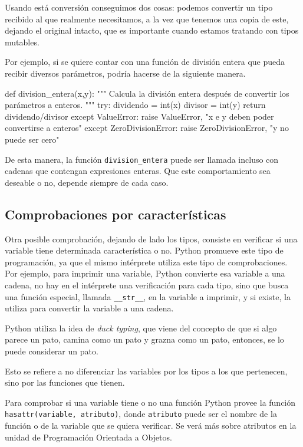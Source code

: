Usando está conversión conseguimos dos cosas: podemos convertir un tipo
recibido al que realmente necesitamos, a la vez que tenemos una copia de
este, dejando el original intacto, que es importante cuando estamos
tratando con tipos mutables.

Por ejemplo, si se quiere contar con una función de división entera que
pueda recibir diversos parámetros, podría hacerse de la siguiente manera.

\begin{codigo-python-sn}
def division_entera(x,y):
    """ Calcula la división entera después de convertir los parámetros a
    enteros. """
    try:
        dividendo = int(x)
        divisor = int(y)
        return dividendo/divisor
    except ValueError:
        raise ValueError, "x e y deben poder convertirse a enteros"
    except ZeroDivisionError:
        raise ZeroDivisionError, "y no puede ser cero"
\end{codigo-python-sn}

De esta manera, la función \lstinline!division_entera! puede ser llamada
incluso con cadenas que contengan expresiones enteras. Que este
comportamiento sea deseable o no, depende siempre de cada caso.

\subsection{Comprobaciones por características}

Otra posible comprobación, dejando de lado los tipos, consiste en verificar
si una variable tiene determinada característica o no. Python promueve este
tipo de programación, ya que el mismo intérprete utiliza este tipo de
comprobaciones. Por ejemplo, para imprimir una variable, Python convierte
esa variable a una cadena, no hay en el intérprete una verificación para
cada tipo, sino que busca una función especial, llamada
\lstinline!__str__!, en la variable a imprimir, y si existe, la utiliza
para convertir la variable a una cadena.

\begin{sabias_que}
Python utiliza la idea de {\it duck typing}, que viene del concepto de que
si algo parece un pato, camina como un pato y grazna como un pato,
entonces, se lo puede considerar un pato.

Esto se refiere a no diferenciar las variables por los tipos a los que
pertenecen, sino por las funciones que tienen.
\end{sabias_que}

Para comprobar si una variable tiene o no una función Python provee la
función \lstinline!hasattr(variable, atributo)!, donde \lstinline!atributo!
puede ser el nombre de la función o de la variable que se quiera verificar.
Se verá más sobre atributos en la unidad de Programación Orientada a
Objetos.

